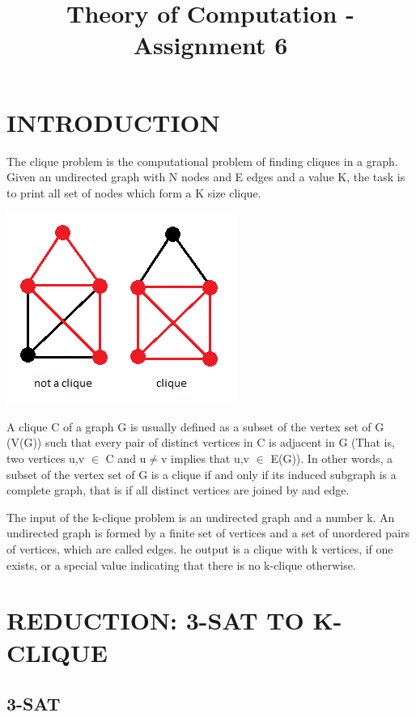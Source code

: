 \documentclass[table]{article}
\title{Theory of Computation - Assignment 6}
\begin{document}
\maketitle
\section{INTRODUCTION}

\leftskip=0.5in 
The clique problem is the computational problem of finding cliques in a graph. Given an undirected graph with N nodes and E edges and a value K, the task is to print all set of nodes which form a K size clique. 

\begin{center}
\includegraphics[scale=0.7]{report/MrlSG.png}
\end{center}

A clique C of a graph G is usually defined as a subset of the vertex set of G (V(G)) such that every pair of distinct vertices in C is adjacent in G (That is, two vertices u,v $\in$ C and u$\neq$v implies that u,v $\in$ E(G)). In other words, a subset of the vertex set of G is a clique if and only if its induced subgraph is a complete graph, that is if all distinct vertices are joined by and edge.\newline
 
The input of the k-clique problem is an undirected graph and a number k. 
An undirected graph is formed by a finite set of vertices and a set of unordered pairs of vertices, which are called edges. he output is a clique with k vertices, if one exists, or a special value indicating that there is no k-clique otherwise. \newline

\leftskip=0.0in 
\section{REDUCTION: 3-SAT TO K-CLIQUE}
\subsection{3-SAT}
\end{document}
